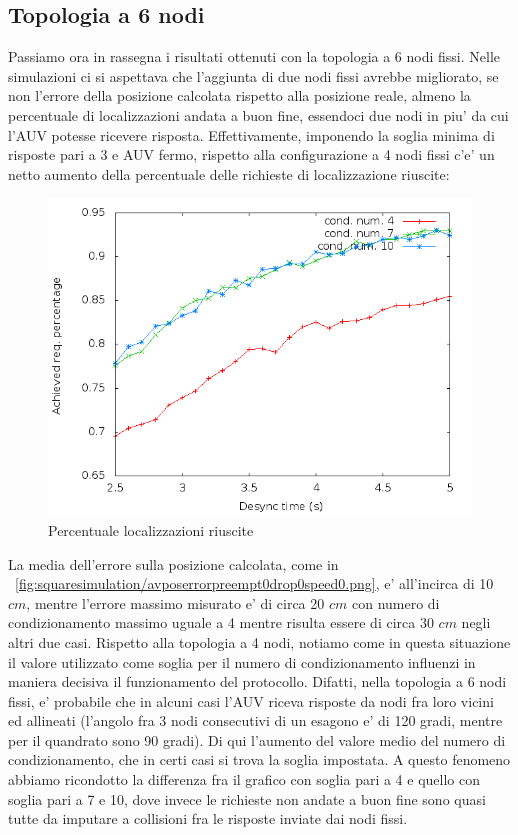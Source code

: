 \subsection{Topologia a 6 nodi}
Passiamo ora in rassegna i risultati ottenuti con la topologia a 6 nodi fissi.
Nelle simulazioni ci si aspettava che l'aggiunta di due nodi fissi avrebbe migliorato, se non l'errore della posizione calcolata rispetto alla posizione reale, almeno la percentuale di localizzazioni andata a buon fine, essendoci due nodi in piu' da cui l'AUV potesse ricevere risposta. Effettivamente, imponendo la soglia minima di risposte pari a 3 e AUV fermo, rispetto alla configurazione a 4 nodi fissi c'e' un netto aumento della percentuale delle richieste di localizzazione riuscite:
\begin{figure}[H]
    \centering
    \includegraphics[scale=0.5]{hexagonsimulation/achievedlocreq3preempt0drop0speed0.png}
    \caption{Percentuale localizzazioni riuscite}
    \label{fig:hexagonsimulation/achievedlocreq3preempt0drop0speed0}
\end{figure}
La media dell'errore sulla posizione calcolata, come in ~\ref{fig:squaresimulation/avposerrorpreempt0drop0speed0.png}, e' all'incirca di 10 $cm$, mentre l'errore massimo misurato e' di circa 20 $cm$ con numero di condizionamento massimo uguale a 4 mentre risulta essere di circa 30 $cm$ negli altri due casi.
Rispetto alla topologia a 4 nodi, notiamo come in questa situazione il valore utilizzato come soglia per il numero di condizionamento influenzi in maniera decisiva il funzionamento del protocollo. Difatti, nella topologia a 6 nodi fissi, e' probabile che in alcuni casi l'AUV riceva risposte da nodi fra loro vicini ed allineati (l'angolo fra 3 nodi consecutivi di un esagono e' di 120 gradi, mentre per il quandrato sono 90 gradi). Di qui l'aumento del valore medio del numero di condizionamento, che in certi casi si trova la soglia impostata. A questo fenomeno abbiamo ricondotto la differenza fra il grafico con soglia pari a 4 e quello con soglia pari a 7 e 10, dove invece le richieste non andate a buon fine sono quasi tutte da imputare a collisioni fra le risposte inviate dai nodi fissi.
